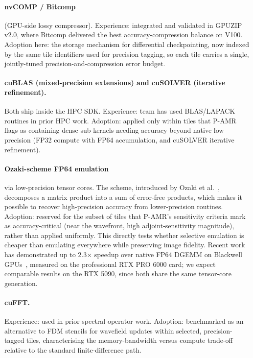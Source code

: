 \documentclass[12pt,a4paper]{article}
\newcommand{\pamr}{P\nobreakdash-AMR}
\begin{document}
\paragraph{nvCOMP / Bitcomp} (GPU-side lossy compressor). Experience:
integrated and validated in GPUZIP v2.0, where Bitcomp delivered the best
accuracy-compression balance on V100. Adoption here: the storage mechanism
for differential checkpointing, now indexed by the same tile identifiers
used for precision tagging, so each tile carries a single, jointly-tuned
precision-and-compression error budget.

\paragraph{cuBLAS (mixed-precision extensions) and cuSOLVER (iterative
refinement).} Both ship inside the HPC SDK. Experience: team has used
BLAS/LAPACK routines in prior HPC work. Adoption: applied only within
tiles that \pamr{} flags as containing dense sub-kernels needing accuracy
beyond native low precision (FP32 compute with FP64 accumulation, and
cuSOLVER iterative refinement).

\paragraph{Ozaki-scheme FP64 emulation} via low-precision tensor cores.
The scheme, introduced by Ozaki et al.~\cite{ozaki2012errorfree},
decomposes a matrix product into a sum of error-free products, which makes
it possible to recover high-precision accuracy from lower-precision
routines. Adoption: reserved for the subset of tiles that \pamr{}'s
sensitivity criteria mark as accuracy-critical (near the wavefront, high
adjoint-sensitivity magnitude), rather than applied uniformly. This
directly tests whether selective emulation is cheaper than emulating
everywhere while preserving image fidelity. Recent work has demonstrated
up to 2.3$\times$ speedup over native FP64 DGEMM on Blackwell
GPUs~\cite{uchino2025ozaki}, measured on the professional RTX PRO 6000
card; we expect comparable results on the RTX 5090, since both share the
same tensor-core generation.

\paragraph{cuFFT.} Experience: used in prior spectral operator work.
Adoption: benchmarked as an alternative to FDM stencils for wavefield
updates within selected, precision-tagged tiles, characterising the
memory-bandwidth versus compute trade-off relative to the standard
finite-difference path.
\end{document}
